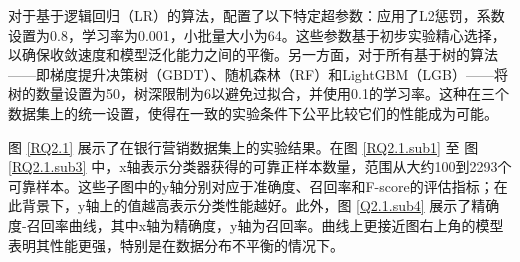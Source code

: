 对于基于逻辑回归（LR）的算法，配置了以下特定超参数：应用了L2惩罚，系数设置为0.8，学习率为0.001，小批量大小为64。这些参数基于初步实验精心选择，以确保收敛速度和模型泛化能力之间的平衡。另一方面，对于所有基于树的算法——即梯度提升决策树（GBDT）、随机森林（RF）和LightGBM（LGB）——将树的数量设置为50，树深限制为6以避免过拟合，并使用0.1的学习率。这种在三个数据集上的统一设置，使得在一致的实验条件下公平比较它们的性能成为可能。



图 \ref{RQ2.1} 展示了在银行营销数据集上的实验结果。在图 \ref{RQ2.1.sub1} 至 图 \ref{RQ2.1.sub3} 中，x轴表示分类器获得的可靠正样本数量，范围从大约100到2293个可靠样本。这些子图中的y轴分别对应于准确度、召回率和F-score的评估指标；在此背景下，y轴上的值越高表示分类性能越好。此外，图 \ref{Q2.1.sub4} 展示了精确度-召回率曲线，其中x轴为精确度，y轴为召回率。曲线上更接近图右上角的模型表明其性能更强，特别是在数据分布不平衡的情况下。
\vspace{-0.1cm}

